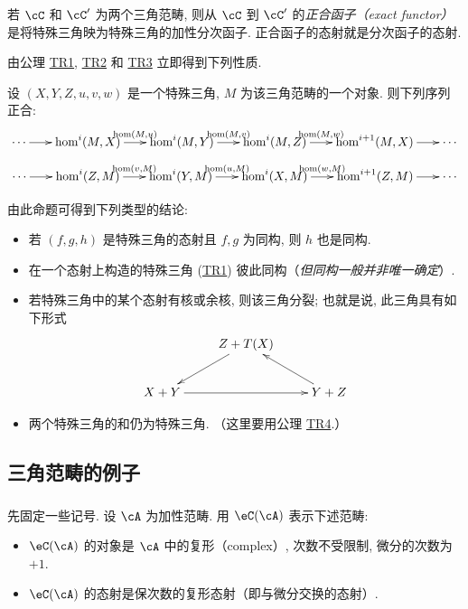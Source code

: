 若 $\cC$ 和 $\cC'$ 为两个三角范畴, 则从 $\cC$ 到 $\cC'$ 的\emph{正合函子（exact functor）}是将特殊三角映为特殊三角的加性分次函子. 正合函子的态射就是分次函子的态射.

由公理 \hyperlink{VIII:TR1}{TR1}, \hyperlink{VIII:TR2}{TR2} 和 \hyperlink{VIII:TR3}{TR3} 立即得到下列性质.

\begin{proposition}\label{VIII:1-1-2}
设 $(X,Y,Z,u,v,w)$ 是一个特殊三角, $M$ 为该三角范畴的一个对象. 则下列序列正合:
\[\xymatrix@C=1.5pc{
  \cdots \ar[r]
    & \hom^i(M,X) \ar[r]^-{\hom(M,u)}
    & \hom^i(M,Y) \ar[r]^-{\hom(M,v)}
    & \hom^i(M,Z) \ar[r]^-{\hom(M,w)}
    & \hom^{i+1}(M,X) \ar[r]
    & \cdots
}\]
\[\xymatrix@C=1.5pc{
  \cdots \ar[r]
    & \hom^i(Z,M) \ar[r]^-{\hom(v,M)}
    & \hom^i(Y,M) \ar[r]^-{\hom(u,M)}
    & \hom^i(X,M) \ar[r]^-{\hom(w,M)}
    & \hom^{i+1}(Z,M) \ar[r]
    & \cdots
}\]
\end{proposition}

由此命题可得到下列类型的结论:
\begin{itemize}
  \item 若 $(f,g,h)$ 是特殊三角的态射且 $f,g$ 为同构, 则 $h$ 也是同构.
  \item 在一个态射上构造的特殊三角 (\hyperlink{VIII:TR1}{TR1}) 彼此同构（\emph{但同构一般并非唯一确定}）.
  \item 若特殊三角中的某个态射有核或余核, 则该三角分裂; 也就是说, 此三角具有如下形式
    \[\xymatrix{
      & Z+T(X) \ar[dl] \\
      X+Y \ar[rr]
        & & Y+Z \ar[ul]
    }\]
  \item 两个特殊三角的和仍为特殊三角. （这里要用公理 \hyperlink{VIII:TR4}{TR4}.）
\end{itemize}

\subsection{三角范畴的例子}\label{VIII:1-2}

\subsubsection{}\label{VIII:1-2-1}

先固定一些记号. 设 $\cA$ 为加性范畴. 用 $\eC(\cA)$ 表示下述范畴:
\begin{itemize}
  \item $\eC(\cA)$ 的对象是 $\cA$ 中的复形（complex）, 次数不受限制, 微分的次数为 $+1$.
  \item $\eC(\cA)$ 的态射是保次数的复形态射（即与微分交换的态射）.
\end{itemize}

